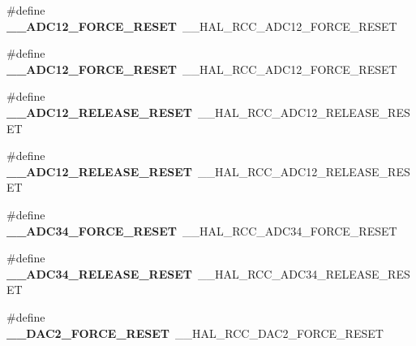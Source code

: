 \begin{DoxyCompactItemize}
\item 
\mbox{\label{group___h_a_l___r_c_c___aliased_gacbc2844f7655815ba4ae65f4ca715dbb}} 
\#define {\bfseries \+\_\+\+\_\+\+A\+D\+C12\+\_\+\+F\+O\+R\+C\+E\+\_\+\+R\+E\+S\+ET}~\+\_\+\+\_\+\+H\+A\+L\+\_\+\+R\+C\+C\+\_\+\+A\+D\+C12\+\_\+\+F\+O\+R\+C\+E\+\_\+\+R\+E\+S\+ET
\item 
\mbox{\label{group___h_a_l___r_c_c___aliased_gacbc2844f7655815ba4ae65f4ca715dbb}} 
\#define {\bfseries \+\_\+\+\_\+\+A\+D\+C12\+\_\+\+F\+O\+R\+C\+E\+\_\+\+R\+E\+S\+ET}~\+\_\+\+\_\+\+H\+A\+L\+\_\+\+R\+C\+C\+\_\+\+A\+D\+C12\+\_\+\+F\+O\+R\+C\+E\+\_\+\+R\+E\+S\+ET
\item 
\mbox{\label{group___h_a_l___r_c_c___aliased_gaccd3e06d5b914cebaaacbc94d05c7660}} 
\#define {\bfseries \+\_\+\+\_\+\+A\+D\+C12\+\_\+\+R\+E\+L\+E\+A\+S\+E\+\_\+\+R\+E\+S\+ET}~\+\_\+\+\_\+\+H\+A\+L\+\_\+\+R\+C\+C\+\_\+\+A\+D\+C12\+\_\+\+R\+E\+L\+E\+A\+S\+E\+\_\+\+R\+E\+S\+ET
\item 
\mbox{\label{group___h_a_l___r_c_c___aliased_gaccd3e06d5b914cebaaacbc94d05c7660}} 
\#define {\bfseries \+\_\+\+\_\+\+A\+D\+C12\+\_\+\+R\+E\+L\+E\+A\+S\+E\+\_\+\+R\+E\+S\+ET}~\+\_\+\+\_\+\+H\+A\+L\+\_\+\+R\+C\+C\+\_\+\+A\+D\+C12\+\_\+\+R\+E\+L\+E\+A\+S\+E\+\_\+\+R\+E\+S\+ET
\item 
\mbox{\label{group___h_a_l___r_c_c___aliased_ga9d32ad39aa9a52a93e5cc48977fac1a1}} 
\#define {\bfseries \+\_\+\+\_\+\+A\+D\+C34\+\_\+\+F\+O\+R\+C\+E\+\_\+\+R\+E\+S\+ET}~\+\_\+\+\_\+\+H\+A\+L\+\_\+\+R\+C\+C\+\_\+\+A\+D\+C34\+\_\+\+F\+O\+R\+C\+E\+\_\+\+R\+E\+S\+ET
\item 
\mbox{\label{group___h_a_l___r_c_c___aliased_gad758bcf779fd9cab005fcc8fc6bf23ae}} 
\#define {\bfseries \+\_\+\+\_\+\+A\+D\+C34\+\_\+\+R\+E\+L\+E\+A\+S\+E\+\_\+\+R\+E\+S\+ET}~\+\_\+\+\_\+\+H\+A\+L\+\_\+\+R\+C\+C\+\_\+\+A\+D\+C34\+\_\+\+R\+E\+L\+E\+A\+S\+E\+\_\+\+R\+E\+S\+ET
\item 
\mbox{\label{group___h_a_l___r_c_c___aliased_gaf8cc5ae83a56884ca8e347a876f425b3}} 
\#define {\bfseries \+\_\+\+\_\+\+D\+A\+C2\+\_\+\+F\+O\+R\+C\+E\+\_\+\+R\+E\+S\+ET}~\+\_\+\+\_\+\+H\+A\+L\+\_\+\+R\+C\+C\+\_\+\+D\+A\+C2\+\_\+\+F\+O\+R\+C\+E\+\_\+\+R\+E\+S\+ET

\end{DoxyCompactItemize}

